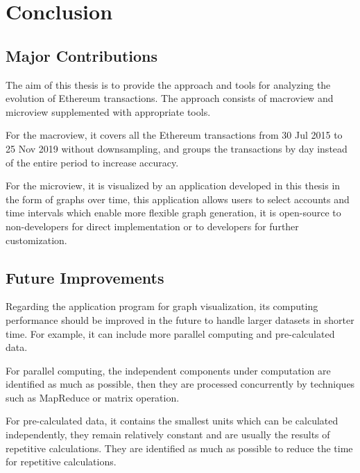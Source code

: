 %

\chapter{Conclusion}
\label{sec:conclusion}


\section{Major Contributions}
\label{sec:conclusion:contributions}

The aim of this thesis is to provide the approach and tools for analyzing the evolution of Ethereum transactions. The approach consists of macroview and microview supplemented with appropriate tools.

For the macroview, it covers all the Ethereum transactions from 30 Jul 2015 to 25 Nov 2019 without downsampling, and groups the transactions by day instead of the entire period to increase accuracy.

For the microview, it is visualized by an application developed in this thesis in the form of graphs over time, this application allows users to select accounts and time intervals which enable more flexible graph generation, it is open-source to non-developers for direct implementation or to developers for further customization.

\section{Future Improvements}
\label{sec:conclusion:improvements}

Regarding the application program for graph visualization, its computing performance should be improved in the future to handle larger datasets in shorter time. For example, it can include more parallel computing and pre-calculated data.

For parallel computing, the independent components under computation are identified as much as possible, then they are processed concurrently by techniques such as MapReduce or matrix operation.

For pre-calculated data, it contains the smallest units which can be calculated independently, they remain relatively constant and are usually the results of repetitive calculations. They are identified as much as possible to reduce the time for repetitive calculations.

